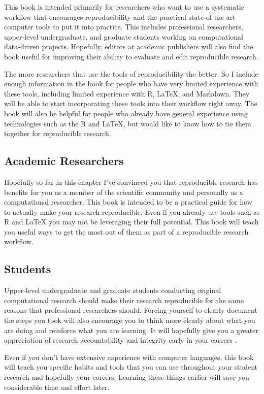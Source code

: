 This book is intended primarily for researchers who want to use a systematic workflow that encourages reproducibility and the practical state-of-the-art computer tools to put it into practice. This includes professional researchers, upper-level undergraduate, and graduate students working on computational data-driven projects. Hopefully, editors at academic publishers will also find the book useful for improving their ability to evaluate and edit reproducible research. 

The more researchers that use the tools of reproducibility the better. So I include enough information in the book for people who have very limited experience with these tools, including limited experience with R, LaTeX, and Markdown. They will be able to start incorporating these tools into their workflow right away. The book will also be helpful for people who already have general experience using technologies such as the R and LaTeX, but would like to know how to tie them together for reproducible research. 

\subsection{Academic Researchers}
Hopefully so far in this chapter I've convinced you that reproducible research has benefits for you as a member of the scientific community and personally as a computational researcher. This book is intended to be a practical guide for how to actually make your research reproducible. Even if you already use tools such as R and LaTeX you may not be leveraging their full potential. This book will teach you useful ways to get the most out of them as part of a reproducible research workflow.

\subsection{Students}
Upper-level undergraduate and graduate students conducting original computational research should make their research reproducible for the same reasons that professional researchers should. Forcing yourself to clearly document the steps you took will also encourage you to think more clearly about what you are doing and reinforce what you are learning. It will hopefully give you a greater appreciation of research accountability and integrity early in your careers \cite[183]{Barr2012,Ball2012}.

Even if you don't have extensive experience with computer languages, this book will teach you specific habits and tools that you can use throughout your student research and hopefully your careers. Learning these things earlier will save you considerable time and effort later.

